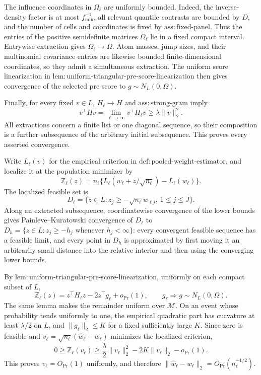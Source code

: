 The influence coordinates in \(\Omega_\ell\) are uniformly bounded.  Indeed, the inverse-density factor is at most \(f_{\min}^{-1}\), all relevant quantile contrasts are bounded by \(D\), and the number of cells and coordinates is fixed by \(\mathrm{ass:fixed\mbox{-}panel}\).  Thus the entries of the positive semidefinite matrices \(\Omega_\ell\) lie in a fixed compact interval.  Entrywise extraction gives \(\Omega_\ell\to\Omega\).  Atom masses, jump sizes, and their multinomial covariance entries are likewise bounded finite-dimensional coordinates, so they admit a simultaneous extraction.  The uniform score linearization in \(\mathrm{lem:uniform\mbox{-}triangular\mbox{-}pre\mbox{-}score\mbox{-}linearization}\) then gives convergence of the selected pre score to \(g\sim N_L(0,\Omega)\).

Finally, for every fixed \(v\in L\), \(H_\ell\to H\) and \(\mathrm{ass:strong\mbox{-}gram}\) imply
\[
 v^\top Hv=\lim_{\ell\to\infty}v^\top H_\ell v
 \geq\lambda\|v\|_2^2.
\]
All extractions concern a finite list or one diagonal sequence, so their composition is a further subsequence of the arbitrary initial subsequence.  This proves every asserted convergence.

Write \(L_\ell(v)\) for the empirical criterion in \(\mathrm{def:pooled\mbox{-}weight\mbox{-}estimator}\), and localize it at the population minimizer by
\[
 \mathbb Z_\ell(z)=n_\ell\{L_\ell(w_\ell+z/\sqrt{n_\ell})-L_\ell(w_\ell)\}.
\]
The localized feasible set is
\[
 D_\ell=\{z\in L:z_j\geq-\sqrt{n_\ell}w_{\ell j},\ 1\leq j\leq J\}.
\]
Along an extracted subsequence, coordinatewise convergence of the lower bounds gives Painleve--Kuratowski convergence of \(D_\ell\) to
\(D_h=\{z\in L:z_j\geq-h_j\text{ whenever }h_j<\infty\}\): every convergent feasible sequence has a feasible limit, and every point in \(D_h\) is approximated by first moving it an arbitrarily small distance into the relative interior and then using the converging lower bounds.

By \(\mathrm{lem:uniform\mbox{-}triangular\mbox{-}pre\mbox{-}score\mbox{-}linearization}\), uniformly on each compact subset of \(L\),
\[
 \mathbb Z_\ell(z)=z^\top H_\ell z-2z^\top g_\ell+o_{\Pr}(1),
 \qquad g_\ell\Rightarrow g\sim N_L(0,\Omega).
\]
The same lemma makes the remainder uniform over \(\mathcal M\).  On an event whose probability tends uniformly to one, the empirical quadratic part has curvature at least \(\lambda/2\) on \(L\), and \(\|g_\ell\|_2\leq K\) for a fixed sufficiently large \(K\).  Since zero is feasible and \(v_\ell=\sqrt{n_\ell}(\widehat w_\ell-w_\ell)\) minimizes the localized criterion,
\[
 0\geq \mathbb Z_\ell(v_\ell)
 \geq \frac\lambda2\|v_\ell\|_2^2-2K\|v_\ell\|_2-o_{\Pr}(1).
\]
This proves \(v_\ell=O_{\Pr}(1)\) uniformly, and therefore
\(\|\widehat w_\ell-w_\ell\|_2=O_{\Pr}(n_\ell^{-1/2})\).

